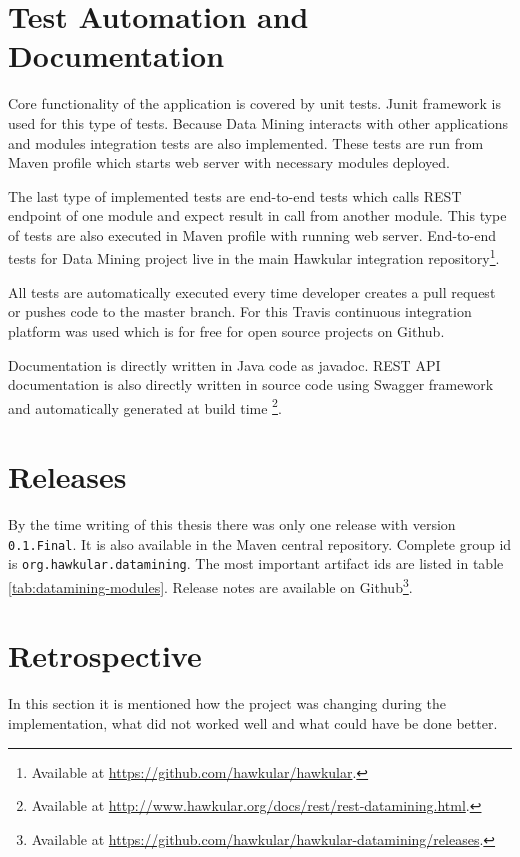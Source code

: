     \section{Test Automation and Documentation}
    Core functionality of the application is covered by unit tests. Junit framework is used for this type of tests.
    Because Data Mining interacts with other applications and modules integration tests are also implemented. These
    tests are run from Maven profile which starts web server with necessary modules deployed.

    The last type of implemented tests are end-to-end tests which calls REST endpoint of one module and expect result
    in call from another module. This type of tests are also executed in Maven profile with running web server.
    End-to-end tests for Data Mining project live in the main Hawkular integration repository\footnote{
    Available at \url{https://github.com/hawkular/hawkular}.}.

    All tests are automatically executed every time developer creates a pull request or pushes code to the master
    branch. For this Travis continuous integration platform was used which is for free for open source projects on
    Github.

    Documentation is directly written in Java code as javadoc. REST API documentation is also directly
    written in source code using Swagger framework and automatically generated at build time
    \footnote{Available at \url{http://www.hawkular.org/docs/rest/rest-datamining.html}.}.

    \section{Releases}
    By the time writing of this thesis there was only one release with version \texttt{0.1.Final}. It is also available
    in the Maven central repository. Complete group id is \texttt{org.hawkular.datamining}. The most important
    artifact ids are listed in table \ref{tab:datamining-modules}. Release notes are available on
    Github\footnote{Available at \url{https://github.com/hawkular/hawkular-datamining/releases}.}.

    \section{Retrospective}
    In this section it is mentioned how the project was changing during the implementation, what did not worked well and
    what could have be done better.

